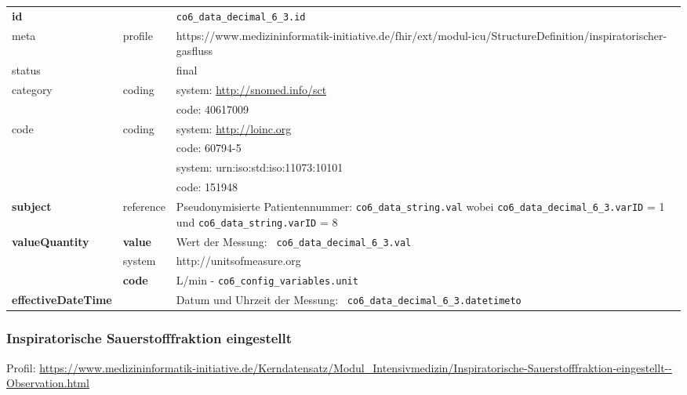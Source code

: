 \begin{longtable}{|l|l|p{7.5cm}|}
        \hline
        \rowcolor{lightgray} \multicolumn{3}{|l|}{Data Mapping (inhaltlich)} \\ \hline
        \textbf{id} &  & \texttt{co6\_data\_decimal\_6\_3.id} \\ \hline
	meta & profile & https://www.medizininformatik-initiative.de/fhir/ext/modul-icu/StructureDefinition/inspiratorischer-gasfluss \\ \hline 
	status &  & final   \\ \hline 
	category & coding & system: \url{http://snomed.info/sct} \\
\cline{3-3}
	& & code: 40617009 \\ \hline
	code & coding & system: \url{http://loinc.org} \\ 
	\cline{3-3} 
	&  & code: 60794-5 \\ 
	\cline{3-3} 
	&  & system: urn:iso:std:iso:11073:10101 \\ 
	\cline{3-3}
	&  & code: 151948 \\ \hline
	 \textbf{subject} & reference & Pseudonymisierte Patientennummer: \texttt{co6\_data\_string.val} wobei \texttt{co6\_data\_decimal\_6\_3.varID} = 1 und \texttt{co6\_data\_string.varID} = 8 \\ \hline
	 \textbf{valueQuantity}  & \textbf{value} & Wert der Messung: \texttt{
co6\_data\_decimal\_6\_3.val} \\
        \cline{2-3}
         & system & http://unitsofmeasure.org \\
         \cline{2-3}
         & \textbf{code} & L/min - \texttt{co6\_config\_variables.unit} \\ \hline
     \textbf{effectiveDateTime}  & & Datum und Uhrzeit der Messung: \texttt{
co6\_data\_decimal\_6\_3.datetimeto} \\
     \hline
\end{longtable}

\subsubsection{Inspiratorische Sauerstofffraktion eingestellt} 

Profil: \url{https://www.medizininformatik-initiative.de/Kerndatensatz/Modul_Intensivmedizin/Inspiratorische-Sauerstofffraktion-eingestellt--Observation.html}

